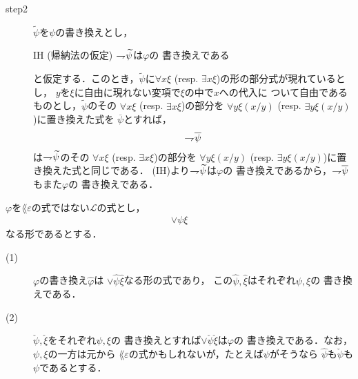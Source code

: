 \begin{metaprf}
\begin{description}
\begin{description}
					\item[step2]
						$\widetilde{\psi}$を$\psi$の書き換えとし，
						\begin{itembox}[l]{IH (帰納法の仮定)}
							$\rightharpoondown\hspace{-0.25em} \widetilde{\psi}$は$\varphi$の
							書き換えである
						\end{itembox}
						と仮定する．このとき，$\widetilde{\psi}$に$\forall x \xi$ 
						(resp. $\exists x \xi$)の形の部分式が現れているとし，
						$y$を$\xi$に自由に現れない変項で$\xi$の中で$x$への代入に
						ついて自由であるものとし，$\widetilde{\psi}$のその
						$\forall x \xi$ (resp. $\exists x \xi$)の部分を
						$\forall y \xi(x/y)$
						(resp. $\exists y \xi(x/y)$)に置き換えた式を
						$\overline{\psi}$とすれば，
						\begin{align}
							\rightharpoondown\hspace{-0.25em} \overline{\psi}
						\end{align}
						は$\rightharpoondown\hspace{-0.25em} \widetilde{\psi}$のその
						$\forall x \xi$ (resp. $\exists x \xi$)の部分を
						$\forall y \xi(x/y)$
						(resp. $\exists y \xi(x/y)$)に置き換えた式と同じである．
						(IH)より$\rightharpoondown\hspace{-0.25em} \widetilde{\psi}$は$\varphi$の
						書き換えであるから，$\rightharpoondown\hspace{-0.25em} \overline{\psi}$もまた$\varphi$の
						書き換えである．
						\QED
				\end{description}
		\end{description}
	\end{metaprf}
	
	\begin{screen}
		\begin{metathm}[部分式の書き換えとの関係2]
		\label{metathm:relation_to_subformula_rewriting_2}
			$\varphi$を$\lang{\varepsilon}$の式ではない$\mathcal{L}$の式とし，
			\begin{align}
				\vee \psi \xi
			\end{align}
			なる形であるとする．
			\begin{description}
				\item[(1)] $\varphi$の書き換え$\widehat{\varphi}$は
					$\vee \widehat{\psi} \widehat{\xi}$なる形の式であり，
					この$\widehat{\psi},\widehat{\xi}$はそれぞれ$\psi,\xi$の
					書き換えである．
					
				\item[(2)] $\check{\psi},\check{\xi}$をそれぞれ$\psi,\xi$の
					書き換えとすれば$\vee \check{\psi} \check{\xi}$は$\varphi$の
					書き換えである．なお，$\psi,\xi$の一方は元から
					$\lang{\varepsilon}$の式かもしれないが，たとえば$\psi$がそうなら
					$\widehat{\psi}$も$\check{\psi}$も$\psi$であるとする．
			\end{description}
		\end{metathm}
	\end{screen}
	
